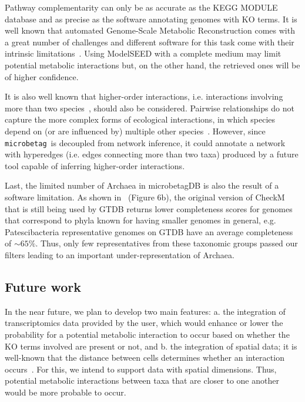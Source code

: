 \documentclass[sn-mathphys,Numbered]{sn-jnl}  %
\theoremstyle{thmstyleone}%
\theoremstyle{thmstyletwo}%
\theoremstyle{thmstylethree}%
\newcommand{\microbetag}{\texttt{microbetag}}
\begin{document}
        Pathway complementarity can only be as accurate as the KEGG MODULE database and as precise as  the software annotating genomes with KO terms.
        It is well known that automated Genome-Scale Metabolic Reconstruction comes with a great number of challenges and different software for this task come with their intrinsic limitations~\cite{mendoza2019systematic}. 
        Using ModelSEED with a complete medium may limit potential metabolic interactions but, on the other hand, the retrieved ones will be of higher confidence.

        It is also well known that higher-order interactions, i.e. interactions involving more than two species~\cite{zelezniak2015metabolic}, should also be considered.
        Pairwise relationships do not capture the more complex forms of ecological interactions, in which species depend on (or are influenced by) multiple other species~\cite{faust2012microbialReviewInteractions}.
        However, since \microbetag~is decoupled from network inference, it could annotate a network with hyperedges (i.e. edges connecting more than two taxa) produced by a future tool capable of inferring higher-order interactions.

        Last, the limited number of Archaea in microbetagDB is also the result of a software limitation.
        As shown in~\cite{chklovski2023checkm2} (Figure 6b), the original version of CheckM~\cite{parks2015checkm} that is still being used by GTDB returns lower completeness scores for genomes that correspond to phyla known for having smaller genomes in general, 
        e.g. Patescibacteria representative genomes on GTDB have an average completeness of $\sim 65\%$.
        Thus, only few representatives from these taxonomic groups passed our filters leading to an important under-representation of Archaea.


    \subsection*{Future work}
    \label{subsec:future}

        In the near future, we plan to develop two main features: 
        a. the integration of transcriptomics data provided by the user, which would enhance or lower the probability for a potential metabolic interaction to occur based on whether the KO terms involved are present or not, and 
        b. the integration of spatial data; it is well-known that 
        the distance between cells 
        determines whether an 
        interaction occurs~\cite{dal2020short}.
        For this, we intend to support data with 
        spatial dimensions. 
        Thus, potential metabolic interactions between taxa that are closer to one another would be more probable to occur.
\end{document}
